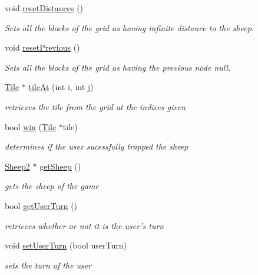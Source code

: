 \begin{DoxyCompactItemize}
void \hyperlink{classGame2Scene_ace98f73655b3dc8ed1ea9ebe842e583c}{reset\-Distances} ()
\begin{DoxyCompactList}\small\item\em \-Sets all the blocks of the grid as having infinite distance to the sheep. \end{DoxyCompactList}\item 
void \hyperlink{classGame2Scene_a23a62e1bbf7e658c1bbc492011d9785b}{reset\-Previous} ()
\begin{DoxyCompactList}\small\item\em \-Sets all the blocks of the grid as having the previous node null. \end{DoxyCompactList}\item 
\hyperlink{classTile}{\-Tile} $\ast$ \hyperlink{classGame2Scene_a6e41f95c3cd53553076445ee42771b17}{tile\-At} (int i, int j)
\begin{DoxyCompactList}\small\item\em retrieves the tile from the grid at the indices given \end{DoxyCompactList}\item 
bool \hyperlink{classGame2Scene_ac67be84c6e44a47a4c6cfb914e6ad8b4}{win} (\hyperlink{classTile}{\-Tile} $\ast$tile)
\begin{DoxyCompactList}\small\item\em determines if the user sucessfully trapped the sheep \end{DoxyCompactList}\item 
\hyperlink{classSheep2}{\-Sheep2} $\ast$ \hyperlink{classGame2Scene_a18f8818b0aa1b4f62db76a46ef0a4264}{get\-Sheep} ()
\begin{DoxyCompactList}\small\item\em gets the sheep of the game \end{DoxyCompactList}\item 
bool \hyperlink{classGame2Scene_a7da54792cb9b5c90fd0ba55ab3806be8}{get\-User\-Turn} ()
\begin{DoxyCompactList}\small\item\em retrieves whether or not it is the user's turn \end{DoxyCompactList}\item 
void \hyperlink{classGame2Scene_ad0bee4e6175c046ea2cf7e96efaf86bf}{set\-User\-Turn} (bool user\-Turn)
\begin{DoxyCompactList}\small\item\em sets the turn of the user \end{DoxyCompactList}\item 

\end{DoxyCompactItemize}
